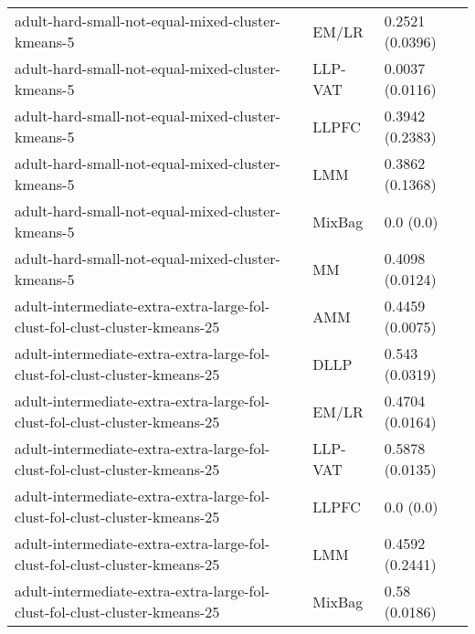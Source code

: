 \begin{longtable}{lll}
                                                            adult-hard-small-not-equal-mixed-cluster-kmeans-5 &     EM/LR &                       0.2521 (0.0396) \\
                                                            adult-hard-small-not-equal-mixed-cluster-kmeans-5 &   LLP-VAT &                       0.0037 (0.0116) \\
                                                            adult-hard-small-not-equal-mixed-cluster-kmeans-5 &     LLPFC &                       0.3942 (0.2383) \\
                                                            adult-hard-small-not-equal-mixed-cluster-kmeans-5 &       LMM &                       0.3862 (0.1368) \\
                                                            adult-hard-small-not-equal-mixed-cluster-kmeans-5 &    MixBag &                             0.0 (0.0) \\
                                                            adult-hard-small-not-equal-mixed-cluster-kmeans-5 &        MM &                       0.4098 (0.0124) \\
                                   adult-intermediate-extra-extra-large-fol-clust-fol-clust-cluster-kmeans-25 &       AMM &                       0.4459 (0.0075) \\
                                   adult-intermediate-extra-extra-large-fol-clust-fol-clust-cluster-kmeans-25 &      DLLP &                        0.543 (0.0319) \\
                                   adult-intermediate-extra-extra-large-fol-clust-fol-clust-cluster-kmeans-25 &     EM/LR &                       0.4704 (0.0164) \\
                                   adult-intermediate-extra-extra-large-fol-clust-fol-clust-cluster-kmeans-25 &   LLP-VAT &                       0.5878 (0.0135) \\
                                   adult-intermediate-extra-extra-large-fol-clust-fol-clust-cluster-kmeans-25 &     LLPFC &                             0.0 (0.0) \\
                                   adult-intermediate-extra-extra-large-fol-clust-fol-clust-cluster-kmeans-25 &       LMM &                       0.4592 (0.2441) \\
                                   adult-intermediate-extra-extra-large-fol-clust-fol-clust-cluster-kmeans-25 &    MixBag &                         0.58 (0.0186) \\

\end{longtable}
